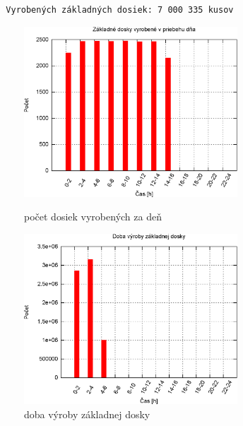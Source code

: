 \documentclass[12pt,a4paper,titlepage,final]{article}
\begin{document}
\begin{verbatim}
  Vyrobených základných dosiek: 7 000 335 kusov
\end{verbatim}

\begin{figure}[ht]
  \centering
  \begin{minipage}{0.45\linewidth}
  \centering
  \includegraphics[width=8cm]{doc/1_hist1.eps}
  \caption{počet dosiek vyrobených za deň}
  \end{minipage}
  \quad
  \begin{minipage}{0.45\linewidth}
    \centering
    \includegraphics[width=8cm]{doc/1_hist2.eps}
    \caption{doba výroby základnej dosky}
  \end{minipage}
\end{figure}
\end{document}
